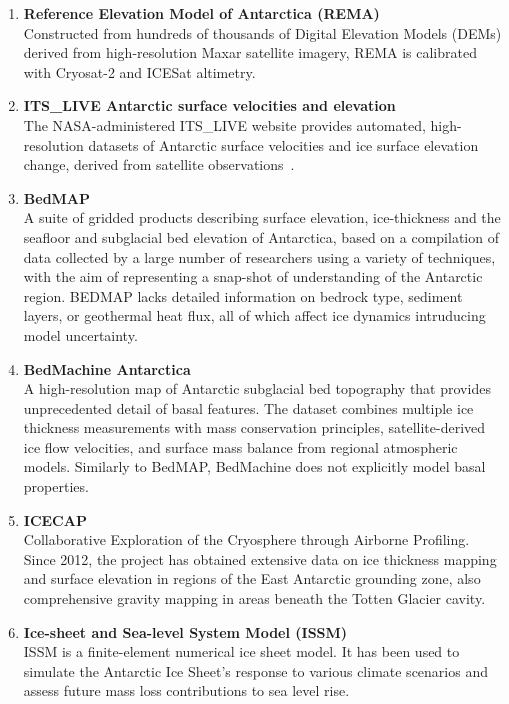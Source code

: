 \begin{enumerate}
    \item\textbf{Reference Elevation Model of Antarctica (REMA)}\\
   Constructed from hundreds of thousands of Digital Elevation Models (DEMs) derived from high-resolution Maxar satellite imagery, REMA is calibrated with Cryosat-2 and ICESat altimetry\cite{REMA}.

    \item\textbf{ITS\_LIVE Antarctic surface velocities and elevation}\\
    The NASA-administered ITS\_LIVE website provides automated, high-resolution datasets of Antarctic surface velocities and ice surface elevation change, derived from satellite observations~\cite{itslive}.

    \item\textbf{BedMAP}\\ 
    A suite of gridded products describing surface elevation, ice-thickness and the seafloor and subglacial bed elevation of Antarctica, based on a compilation of data collected by a large number of researchers using a variety of techniques, with the aim of representing a snap-shot of understanding of the Antarctic region\cite{Fretwell_2013}. BEDMAP lacks detailed information on bedrock type, sediment layers, or geothermal heat flux, all of which affect ice dynamics intruducing model uncertainty.

    \item\textbf{BedMachine Antarctica}\\
    A high-resolution map of Antarctic subglacial bed topography that provides unprecedented detail of basal features. The dataset combines multiple ice thickness measurements with mass conservation principles, satellite-derived ice flow velocities, and surface mass balance from regional atmospheric models\cite{Morlighem_2020}. Similarly to BedMAP, BedMachine does not explicitly model basal properties.

    \item\textbf{ICECAP}\\ 
    Collaborative Exploration of the Cryosphere through Airborne Profiling. Since 2012, the project has obtained extensive data on ice thickness mapping and surface elevation in regions of the East Antarctic grounding zone, also comprehensive gravity mapping in areas beneath the Totten Glacier cavity\cite{ICECAP}.

    \item\textbf{Ice-sheet and Sea-level System Model (ISSM)}\\
    ISSM is a finite-element numerical ice sheet model. It has been used to simulate the Antarctic Ice Sheet’s response to various climate scenarios and assess future mass loss contributions to sea level rise\cite{deRydt_2013, Morlighem_2020, ISSM}.
\end{enumerate}

